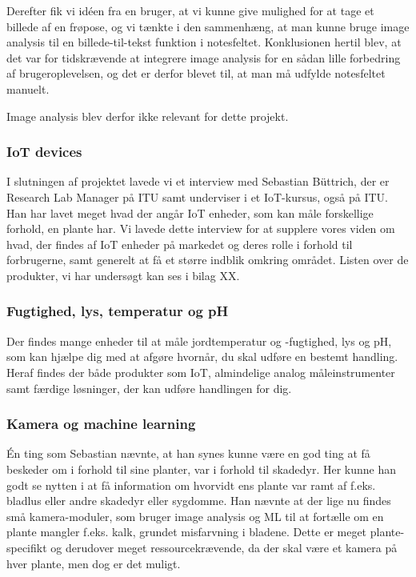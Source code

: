 Derefter fik vi idéen fra en bruger, at vi kunne give mulighed for at tage et billede af en frøpose, og vi tænkte i den sammenhæng, at man kunne bruge image analysis til en billede-til-tekst funktion i notesfeltet. Konklusionen hertil blev, at det var for tidskrævende at integrere image analysis for en sådan lille forbedring af brugeroplevelsen, og det er derfor blevet til, at man må udfylde notesfeltet manuelt. 

Image analysis blev derfor ikke relevant for dette projekt.

\subsubsection{IoT devices}
I slutningen af projektet lavede vi et interview med Sebastian Büttrich, der er Research Lab Manager på ITU samt underviser i et IoT-kursus, også på ITU. Han har lavet meget hvad der angår IoT enheder, som kan måle forskellige forhold, en plante har. Vi lavede dette interview for at supplere vores viden om hvad, der findes af IoT enheder på markedet og deres rolle i forhold til forbrugerne, samt generelt at få et større indblik omkring området. Listen over de produkter, vi har undersøgt kan ses i bilag XX.

\subsubsection*{Fugtighed, lys, temperatur og pH}
Der findes mange enheder til at måle jordtemperatur og -fugtighed, lys og pH, som kan hjælpe dig med at afgøre hvornår, du skal udføre en bestemt handling. Heraf findes der både produkter som IoT, almindelige analog måleinstrumenter samt færdige løsninger, der kan udføre handlingen for dig.

\subsubsection*{Kamera og machine learning}
Én ting som Sebastian nævnte, at han synes kunne være en god ting at få beskeder om i forhold til sine planter, var i forhold til skadedyr. Her kunne han godt se nytten i at få information om hvorvidt ens plante var ramt af f.eks. bladlus eller andre skadedyr eller sygdomme. Han nævnte at der lige nu findes små kamera-moduler, som bruger image analysis og ML til at fortælle om en plante mangler f.eks. kalk, grundet misfarvning i bladene. Dette er meget plante-specifikt og derudover meget ressourcekrævende, da der skal være et kamera på hver plante, men dog er det muligt.

